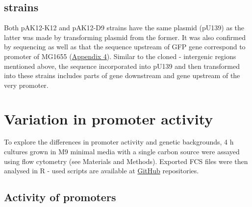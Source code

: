 \subsection{ strains}
Both pA\textunderscore K12-K12 and pA\textunderscore K12-D9 strains have the same plasmid (pU139) as the latter was made by transforming plasmid from the former.
It was also confirmed by sequencing as well as that the sequence upstream of GFP gene correspond to  promoter of MG1655 (\hyperlink{precAalign}{Appendix 4}).
Similar to the cloned - intergenic regions mentioned above, the sequence incorporated into pU139 and then transformed into these  strains includes parts of  gene downstream and  gene upstream of the very promoter.


\section{Variation in promoter activity}
To explore the differences in promoter activity and genetic backgrounds, 4 h cultures grown in M9 minimal media with a single carbon source were assayed using flow cytometry (see Materials and Methods).
Exported FCS files were then analysed in R - used scripts are available at \href{https://github.com/marketavlkova/}{GitHub} repositories.

\subsection{Activity of  promoters}


\shorthandon{-} 


